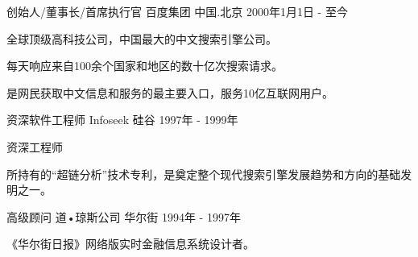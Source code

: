 

\begin{cventries}

  \cventry
    {创始人/董事长/首席执行官} %
    {百度集团} %
    {中国.北京} %
    {2000年1月1日 - 至今} %
    {
      \begin{cvitems} %
        \item {全球顶级高科技公司，中国最大的中文搜索引擎公司。}
        \item {每天响应来自100余个国家和地区的数十亿次搜索请求。}
        \item {是网民获取中文信息和服务的最主要入口，服务10亿互联网用户。}
      \end{cvitems}
    }

  \cventry
    {资深软件工程师} %
    {Infoseek} %
    {硅谷} %
    {1997年 - 1999年} %
    {
      \begin{cvitems} %
        \item {资深工程师}
        \item {所持有的“超链分析”技术专利，是奠定整个现代搜索引擎发展趋势和方向的基础发明之一。}
      \end{cvitems}
    }
  \cventry
    {高级顾问} %
    {道•琼斯公司} %
    {华尔街} %
    {1994年 - 1997年} %
    {
      \begin{cvitems} %
        \item {《华尔街日报》网络版实时金融信息系统设计者。}
      \end{cvitems}
    }

\end{cventries}
